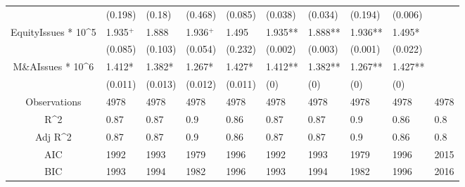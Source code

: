 \documentclass{article}
\begin{document}
\begin{table}[H]
\begin{tabular}{|clllllllll|}
   & (0.198) & (0.18) & (0.468) & (0.085) & (0.038) & (0.034) & (0.194) & (0.006) &  \\ 
  EquityIssues * 10^5 & 1.935$^{+}$ & 1.888 & 1.936$^{+}$ & 1.495 & 1.935** & 1.888** & 1.936** & 1.495* &  \\ 
   & (0.085) & (0.103) & (0.054) & (0.232) & (0.002) & (0.003) & (0.001) & (0.022) &  \\ 
  M\&AIssues * 10^6 & 1.412* & 1.382* & 1.267* & 1.427* & 1.412** & 1.382** & 1.267** & 1.427** &  \\ 
   & (0.011) & (0.013) & (0.012) & (0.011) & (0) & (0) & (0) & (0) &  \\ 
  \hline 
 Observations & 4978 & 4978 & 4978 & 4978 & 4978 & 4978 & 4978 & 4978 & 4978 \\ 
  R^2 & 0.87 & 0.87 & 0.9 & 0.86 & 0.87 & 0.87 & 0.9 & 0.86 & 0.8 \\ 
  Adj R^2 & 0.87 & 0.87 & 0.9 & 0.86 & 0.87 & 0.87 & 0.9 & 0.86 & 0.8 \\ 
  AIC & 1992 & 1993 & 1979 & 1996 & 1992 & 1993 & 1979 & 1996 & 2015 \\ 
  BIC & 1993 & 1994 & 1982 & 1996 & 1993 & 1994 & 1982 & 1996 & 2016 \\ 
   \hline
\end{tabular}
 
\end{table}
\end{document}
